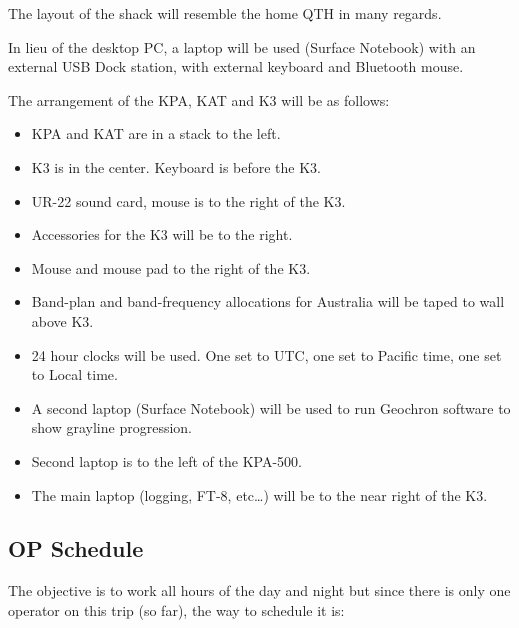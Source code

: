 \documentclass[11pt]{article}
\begin{document}
The layout of the shack will resemble the home QTH in many regards.
\par
In lieu of the desktop PC, a laptop will be used (Surface Notebook) with
an external USB Dock station, with external keyboard and Bluetooth mouse.
\par
The arrangement of the KPA, KAT and K3 will be as follows:
\par
\begin{itemize}
\item KPA and KAT are in a stack to the left.
\item K3 is in the center.  Keyboard is before the K3.
\item UR-22 sound card, mouse is to the right of the K3.
\item Accessories for the K3 will be to the right.
\item Mouse and mouse pad to the right of the K3.
\item Band-plan and band-frequency allocations for Australia will be taped
to wall above K3.
\item 24 hour clocks will be used.  One set to UTC, one set to Pacific time, one
set to Local time.
\item A second laptop (Surface Notebook) will be used to run Geochron software
to show grayline progression.
\item Second laptop is to the left of the KPA-500.
\item The main laptop (logging, FT-8, etc\ldots) will be to the near right of the K3.
\end{itemize}


\subsection{OP Schedule}

The objective is to work all hours of the day and night but since
there is only one operator on this trip (so far), the way to schedule it is:
\end{document}
